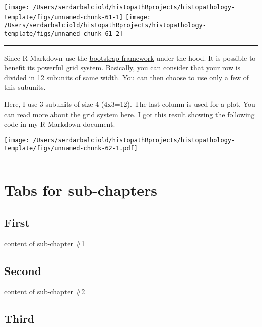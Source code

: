 \documentclass[
]{article}
\begin{document}
\texttt{[image: /Users/serdarbalciold/histopathRprojects/histopathology-template/figs/unnamed-chunk-61-1]}
\texttt{[image: /Users/serdarbalciold/histopathRprojects/histopathology-template/figs/unnamed-chunk-61-2]}

\begin{center}\rule{0.5\linewidth}{0.5pt}\end{center}

Since R Markdown use the
\href{https://getbootstrap.com/docs/4.0/layout/grid/}{bootstrap
framework} under the hood. It is possible to benefit its powerful grid
system. Basically, you can consider that your row is divided in 12
subunits of same width. You can then choose to use only a few of this
subunits.

Here, I use 3 subunits of size 4 (4x3=12). The last column is used for a
plot. You can read more about the grid system
\href{bootstrap\%20grid\%20system}{here}. I got this result showing the
following code in my R Markdown document.

\texttt{[image: /Users/serdarbalciold/histopathRprojects/histopathology-template/figs/unnamed-chunk-62-1.pdf]}

\begin{center}\rule{0.5\linewidth}{0.5pt}\end{center}

\hypertarget{buttons}{%
\section{Tabs for sub-chapters}\label{buttons}}

\hypertarget{first}{%
\subsection{First}\label{first}}

content of sub-chapter \#1

\hypertarget{second}{%
\subsection{Second}\label{second}}

content of sub-chapter \#2

\hypertarget{third}{%
\subsection{Third}\label{third}}
\end{document}
